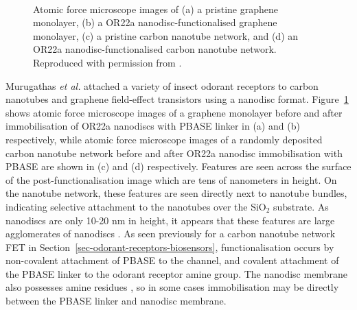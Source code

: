 \documentclass[
  a4paper,
]{scrbook}
\begin{document}
\begin{figure}
\begin{minipage}[t]{0.45\linewidth}
\end{minipage}%
%
\begin{minipage}[t]{0.01\linewidth}

{\centering 

~

}

\end{minipage}%

\caption[Atomic force microscope images of pristine and
nanodisc-functionalised
thin-films.]{\label{fig-functionalisation-AFM-literature}Atomic force
microscope images of (a) a pristine graphene monolayer, (b) a OR22a
nanodisc-functionalised graphene monolayer, (c) a pristine carbon
nanotube network, and (d) an OR22a nanodisc-functionalised carbon
nanotube network. Reproduced with permission from
\autocite{Murugathas2019a,Murugathas2020}.}

\end{figure}

Murugathas \emph{et al.} attached a variety of insect odorant receptors
to carbon nanotubes and graphene field-effect transistors using a
nanodisc format. Figure~\ref{fig-functionalisation-AFM-literature} shows
atomic force microscope images of a graphene monolayer before and after
immobilisation of OR22a nanodiscs with PBASE linker in (a) and (b)
respectively, while atomic force microscope images of a randomly
deposited carbon nanotube network before and after OR22a nanodisc
immobilisation with PBASE are shown in (c) and (d) respectively.
Features are seen across the surface of the post-functionalisation image
which are tens of nanometers in height. On the nanotube network, these
features are seen directly next to nanotube bundles, indicating
selective attachment to the nanotubes over the SiO\(_2\) substrate. As
nanodiscs are only 10-20 nm in height, it appears that these features
are large agglomerates of nanodiscs
\autocite{Nath2007,Bayburt2010,Murugathas2019a,Murugathas2020}. As seen
previously for a carbon nanotube network FET in
Section~\ref{sec-odorant-receptors-biosensors}, functionalisation occurs
by non-covalent attachment of PBASE to the channel, and covalent
attachment of the PBASE linker to the odorant receptor amine group. The
nanodisc membrane also possesses amine residues \autocite{Bayburt2010},
so in some cases immobilisation may be directly between the PBASE linker
and nanodisc membrane.
\end{document}
